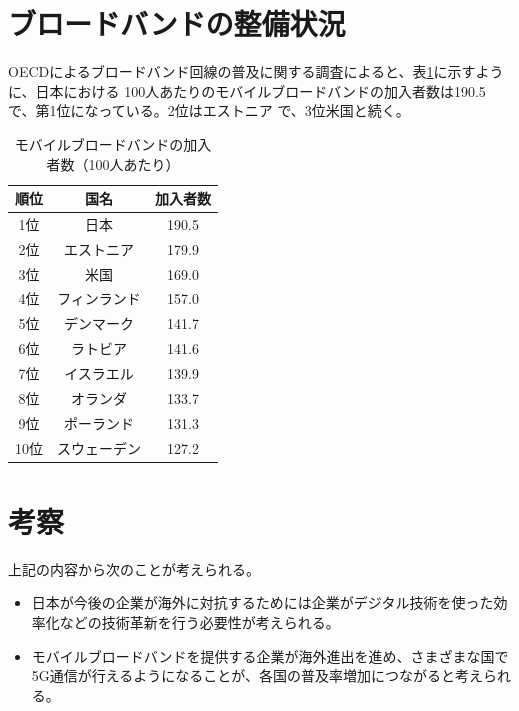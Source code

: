 \documentclass[a4paper,11pt,dvipdfmx]{ujarticle}
\begin{document}
\section{ブロードバンドの整備状況}
OECDによるブロードバンド回線の普及に関する調査\cite{oecd}によると、表\ref{tbl:table}に示すように、日本における 100人あたりのモバイルブロードバンドの加入者数は190.5で、第1位になっている。2位はエストニア
で、3位米国と続く。
\begin{table}[htbp]
    \centering
    \caption{モバイルブロードバンドの加入者数（100人あたり）}\label{tbl:table}
    \begin{tabular}{|c|c|c|}
        \hline
        順位 & 国名 & 加入者数 \\
        \hline
        1位 & 日本 & 190.5 \\
        \hline
        2位 & エストニア & 179.9 \\
        \hline
        3位 & 米国 & 169.0 \\
        \hline
        4位 & フィンランド & 157.0 \\
        \hline
        5位 & デンマーク & 141.7 \\
        \hline
        6位 & ラトビア & 141.6 \\
        \hline
        7位 & イスラエル & 139.9 \\
        \hline
        8位 & オランダ & 133.7 \\
        \hline
        9位 & ポーランド & 131.3 \\
        \hline
        10位 & スウェーデン & 127.2 \\
        \hline
    \end{tabular}
\end{table}

\section{考察}
上記の内容から次のことが考えられる。
\begin{itemize}
    \item 日本が今後の企業が海外に対抗するためには企業がデジタル技術を使った効率化などの技術革新を行う必要性が考えられる。
    \item モバイルブロードバンドを提供する企業が海外進出を進め、さまざまな国で5G通信が行えるようになることが、各国の普及率増加につながると考えられる。
\end{itemize}



\end{document}
